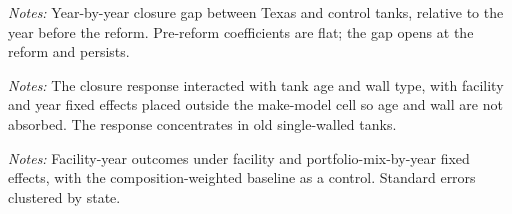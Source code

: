 \documentclass[
  12pt,
]{article}
\begin{document}
\clearpage
\null\vfill
\begin{center}
\label{fig-es-tank}
\par\vspace{8pt}
\par\vspace{8pt}
\begin{minipage}{0.85\textwidth}\small\textit{Notes:} Year-by-year closure gap between Texas and control tanks, relative to the year before the reform. Pre-reform coefficients are flat; the gap opens at the reform and persists.\end{minipage}
\end{center}
\vfill\clearpage

\clearpage
\null\vfill
\begin{center}
\label{tbl-risk-conc}
\vspace{6pt}
\par\vspace{10pt}
\begin{minipage}{0.85\textwidth}\small\textit{Notes:} The closure response interacted with tank age and wall type, with facility and year fixed effects placed outside the make-model cell so age and wall are not absorbed. The response concentrates in old single-walled tanks.\end{minipage}
\end{center}
\vfill\clearpage

\clearpage
\null\vfill
\begin{center}
\label{tbl-fac-att}
\vspace{6pt}
\par\vspace{10pt}
\begin{minipage}{0.85\textwidth}\small\textit{Notes:} Facility-year outcomes under facility and portfolio-mix-by-year fixed effects, with the composition-weighted baseline as a control. Standard errors clustered by state.\end{minipage}
\end{center}
\vfill\clearpage
\end{document}
